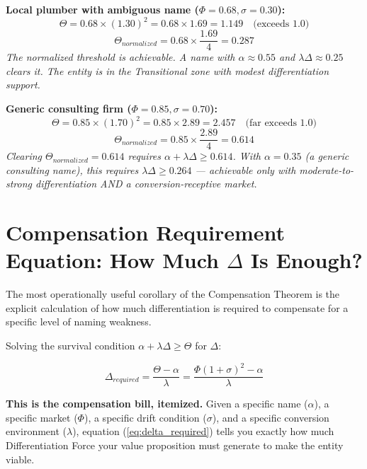 \documentclass[12pt, openany]{book}
\theoremstyle{thmstyle}
\theoremstyle{defstyle}
\begin{document}
\begin{calcbox}
\textbf{Local plumber with ambiguous name ($\Phi = 0.68, \sigma = 0.30$):}
\[
\Theta = 0.68 \times (1.30)^2 = 0.68 \times 1.69 = 1.149 \quad \text{(exceeds 1.0)}
\]
\[
\Theta_{normalized} = 0.68 \times \frac{1.69}{4} = 0.287
\]
\textit{The normalized threshold is achievable. A name with $\alpha \approx 0.55$ and $\lambda\Delta \approx 0.25$ clears it. The entity is in the Transitional zone with modest differentiation support.}

\vspace{8pt}
\textbf{Generic consulting firm ($\Phi = 0.85, \sigma = 0.70$):}
\[
\Theta = 0.85 \times (1.70)^2 = 0.85 \times 2.89 = 2.457 \quad \text{(far exceeds 1.0)}
\]
\[
\Theta_{normalized} = 0.85 \times \frac{2.89}{4} = 0.614
\]
\textit{Clearing $\Theta_{normalized} = 0.614$ requires $\alpha + \lambda\Delta \geq 0.614$. With $\alpha = 0.35$ (a generic consulting name), this requires $\lambda\Delta \geq 0.264$ --- achievable only with moderate-to-strong differentiation AND a conversion-receptive market.}
\end{calcbox}

\section{Compensation Requirement Equation: How Much $\Delta$ Is Enough?}

The most operationally useful corollary of the Compensation Theorem is the explicit calculation of how much differentiation is required to compensate for a specific level of naming weakness.

Solving the survival condition $\alpha + \lambda\Delta \geq \Theta$ for $\Delta$:

\begin{equation}
\Delta_{required} = \frac{\Theta - \alpha}{\lambda} = \frac{\Phi(1+\sigma)^2 - \alpha}{\lambda}
\label{eq:delta_required}
\end{equation}

\textbf{This is the compensation bill, itemized.} Given a specific name ($\alpha$), a specific market ($\Phi$), a specific drift condition ($\sigma$), and a specific conversion environment ($\lambda$), equation (\ref{eq:delta_required}) tells you exactly how much Differentiation Force your value proposition must generate to make the entity viable.
\end{document}
